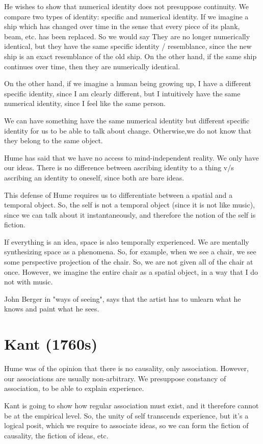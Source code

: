\documentclass[11pt]{book}
\begin{document}
He wishes to show that numerical identity does not presuppose continuity.
We compare two types of identity: specific and numerical identity.
If we imagine a ship which has changed over time in the sense that
every piece of its plank, beam, etc. has been replaced. So we would say
They are no longer numerically identical, but they have the same specific
identity / resemblance, since the new ship is an exact resemblance of the
old ship. On the other hand, if the same ship continues over time, then
they are numerically identical.


On the other hand, if we imagine a human being growing up, I have a different
specific identity, since I am clearly different, but I intuitively
have the same numerical identity, since I feel like the same person.


We can have something have the same numerical identity but different
specific identity for us to be able to talk about change. Otherwise,we 
do not know that they belong to the same object.

Hume has said that we have no access to mind-independent reality. We only
have our ideas. There is no difference between ascribing identity to a thing
v/s ascribing an identity to oneself, since both are bare ideas.

This defense of Hume requires us to differentiate between a spatial and a temporal
object. So, the self is not a temporal object (since it is not like music), since
we can talk about it instantaneously, and therefore the notion of the self
is fiction.

If everything is an idea, space is also temporally experienced. We are mentally
synthesizing space as a phenomena. So, for example, when we see a chair,
we see some perspective projection of the chair. So, we are not given
all of the chair at once. However, we imagine the entire chair as a spatial
object, in a way that I do not with music.

John Berger in "ways of seeing", says that the artist has to unlearn what
he knows and paint what he sees.

\chapter{Kant (1760s)}
Hume was of the opinion that there is no causality, only association. However,
our associations are usually non-arbitrary. We presuppose constancy of association,
to be able to explain experience.

Kant is going to show how regular association must exist, and it therefore
cannot be at the empirical level. So, the unity of self transcends experience, 
but it's a logical posit, which we require to associate ideas, so we can form
the fiction of causality, the fiction of ideas, etc.
\end{document}
